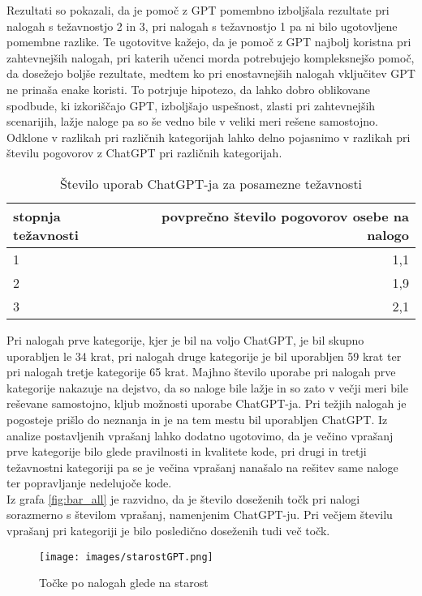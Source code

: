 \documentclass[a4paper,12pt,openright]{book}
\begin{document}
Rezultati so pokazali, da je pomoč z GPT pomembno izboljšala rezultate pri nalogah s težavnostjo 2 in 3, pri nalogah s težavnostjo 1 pa ni bilo ugotovljene pomembne razlike. Te ugotovitve kažejo, da je pomoč z GPT najbolj koristna pri zahtevnejših nalogah, pri katerih učenci morda potrebujejo kompleksnejšo pomoč, da dosežejo boljše rezultate, medtem ko pri enostavnejših nalogah vključitev GPT ne prinaša enake koristi. To potrjuje hipotezo, da lahko dobro oblikovane spodbude, ki izkoriščajo GPT, izboljšajo uspešnost, zlasti pri zahtevnejših scenarijih, lažje naloge pa so še vedno bile v veliki meri rešene samostojno.\\
Odklone v razlikah pri različnih kategorijah lahko delno pojasnimo v razlikah pri številu pogovorov z ChatGPT pri različnih kategorijah.

\begin{table}[h!]
\centering
\begin{tabular}{|l|r|}
\hline
\textbf{stopnja težavnosti} & \textbf{povprečno število pogovorov osebe na nalogo} \\
\hline
1 & 1,1 \\
\hline
2 & 1,9 \\
\hline
3 & 2,1 \\
\hline
\end{tabular}
\caption{Število uporab ChatGPT-ja za posamezne težavnosti}
\label{tab:st-pogovorov}
\end{table}
Pri nalogah prve kategorije, kjer je bil na voljo ChatGPT, je bil skupno uporabljen le 34 krat, pri nalogah druge kategorije je bil uporabljen 59 krat ter pri nalogah tretje kategorije 65 krat. Majhno število uporabe pri nalogah prve kategorije nakazuje na dejstvo, da so naloge bile lažje in so zato v večji meri bile reševane samostojno, kljub možnosti uporabe ChatGPT-ja. Pri težjih nalogah je pogosteje prišlo do neznanja in je na tem mestu bil uporabljen ChatGPT. Iz analize postavljenih vprašanj lahko dodatno ugotovimo, da je večino vprašanj prve kategorije bilo glede pravilnosti in kvalitete kode, pri drugi in tretji težavnostni kategoriji pa se je večina vprašanj nanašalo na rešitev same naloge ter popravljanje nedelujoče kode.\\
Iz grafa \ref{fig:bar_all} je razvidno, da je število doseženih točk pri nalogi sorazmerno s številom vprašanj, namenjenim ChatGPT-ju. Pri večjem številu vprašanj pri kategoriji je bilo posledično doseženih tudi več točk. 

\pagebreak
\begin{figure}[H]
    \centering
    \texttt{[image: images/starostGPT.png]}
    \caption{Točke po nalogah glede na starost}
    \label{fig:starostGPT}
\end{figure}
\end{document}
